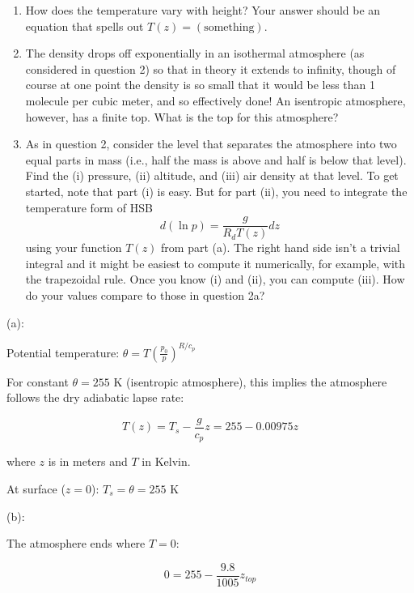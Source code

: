 \documentclass[letterpaper, 11pt]{article}
\newcommand{\1}{\mathds{1}}	%
\theoremstyle{definition}
\begin{document}
\begin{enumerate}
    \item[(a)] How does the temperature vary with height? Your answer should be an equation that spells out $T(z) = (\text{something})$.
    
    \item[(b)] The density drops off exponentially in an isothermal atmosphere (as considered in question 2) so that in theory it extends to infinity, though of course at one point the density is so small that it would be less than 1 molecule per cubic meter, and so effectively done! An isentropic atmosphere, however, has a finite top. What is the top for this atmosphere?
    
    \item[(c)] As in question 2, consider the level that separates the atmosphere into two equal parts in mass (i.e., half the mass is above and half is below that level). Find the (i) pressure, (ii) altitude, and (iii) air density at that level. To get started, note that part (i) is easy. But for part (ii), you need to integrate the temperature form of HSB
    \begin{equation*}
    d(\ln p) = \frac{g}{R_dT(z)}dz
    \end{equation*}
    using your function $T(z)$ from part (a). The right hand side isn't a trivial integral and it might be easiest to compute it numerically, for example, with the trapezoidal rule. Once you know (i) and (ii), you can compute (iii). How do your values compare to those in question 2a?
\end{enumerate}

(a):

Potential temperature: $\theta = T\left(\frac{p_0}{p}\right)^{R/c_p}$

For constant $\theta = 255$ K (isentropic atmosphere), this implies the atmosphere follows the dry adiabatic lapse rate:

\begin{equation*}
T(z) = T_s - \frac{g}{c_p}z = 255 - 0.00975z
\end{equation*}

where $z$ is in meters and $T$ in Kelvin.

At surface ($z=0$): $T_s = \theta = 255$ K

(b):

The atmosphere ends where $T = 0$:

\begin{equation*}
0 = 255 - \frac{9.8}{1005}z_{top}
\end{equation*}
\end{document}
